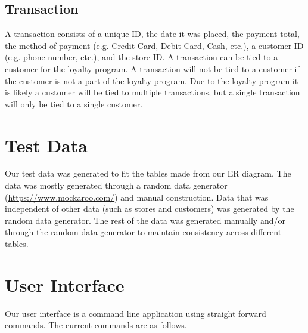 \documentclass[12pt]{article}
\begin{document}
		\subsection{Transaction}
			A transaction consists of a unique ID, the date it was placed, the payment
			total, the method of payment (e.g. Credit Card, Debit Card, Cash, etc.), a
			customer ID (e.g. phone number, etc.), and the store ID. A transaction can
			be tied to a customer for the loyalty program. A transaction will not be
			tied to a customer if the customer is not a part of the loyalty program.
			Due to the loyalty program it is likely a customer will be tied to
			multiple transactions, but a single transaction will only be tied to a
			single customer.



	\section{Test Data}
		Our test data was generated to fit the tables made from our ER diagram. The
		data was mostly generated through a random data generator
		(\url{https://www.mockaroo.com/}) and manual construction. Data that was
		independent of other data (such as stores and customers) was generated by
		the random data generator. The rest of the data was generated manually
		and/or through the random data generator to maintain consistency across
		different tables.

	\section{User Interface}
    Our user interface is a command line application using straight forward
    commands. The current commands are as follows.
\end{document}
